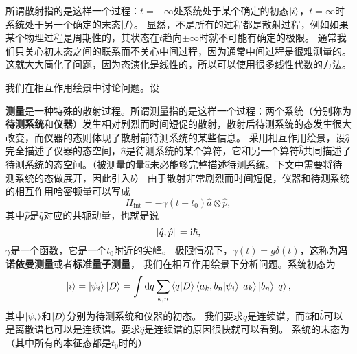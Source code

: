 \documentclass[hyperref, UTF8, a4paper]{ctexart}
\newcommand*{\ii}{\mathrm{i}}
\begin{document}

所谓散射指的是这样一个过程：$t = -\infty$处系统处于某个确定的初态$\ket{i}$，$t = \infty$时系统处于另一个确定的末态$\ket{f}$。
显然，不是所有的过程都是散射过程，例如如果某个物理过程是周期性的，其状态在$t$趋向$\pm \infty$时就不可能有确定的极限。
通常我们只关心初末态之间的联系而不关心中间过程，因为通常中间过程是很难测量的。这就大大简化了问题，因为态演化是线性的，所以可以使用很多线性代数的方法。

我们在相互作用绘景中讨论问题。设

\textbf{测量}是一种特殊的散射过程。所谓测量指的是这样一个过程：两个系统（分别称为\textbf{待测系统}和\textbf{仪器}）发生相对剧烈而时间短促的散射，散射后待测系统的态发生很大改变，而仪器的态则体现了散射前待测系统的某些信息。
采用相互作用绘景，设$\hat{q}$完全描述了仪器的态空间，$\hat{a}$是待测系统的某个算符，它和另一个算符$\hat{b}$共同描述了待测系统的态空间。（被测量的量$\hat{a}$未必能够完整描述待测系统。下文中需要将待测系统的态做展开，因此引入$\hat{b}$）
由于散射非常剧烈而时间短促，仪器和待测系统的相互作用哈密顿量可以写成
\begin{equation}
    H_\text{int} = - \gamma(t-t_0) \hat{a} \otimes \hat{p},
\end{equation}
其中$\hat{p}$是$\hat{q}$对应的共轭动量，也就是说
\[
    \comm*{\hat{q}}{\hat{p}} = \ii \hbar,
\]
$\gamma$是一个函数，它是一个$t_0$附近的尖峰。
极限情况下，$\gamma(t) = g \delta(t)$，这称为\textbf{冯诺依曼测量}或者\textbf{标准量子测量}，
我们在相互作用绘景下分析问题。系统初态为
\[
    \ket{i} = \ket{\psi_i} \ket{D} = \int \dd{q} \sum_{k, n} \braket{q}{D} \braket{a_k, b_n}{\psi_i} \ket{a_k} \ket{b_n} \ket{q},
\]
其中$\ket{\psi_i}$和$\ket{D}$分别为待测系统和仪器的初态。
我们要求$\hat{q}$是连续谱，而$\hat{a}$和$\hat{b}$可以是离散谱也可以是连续谱。要求$\hat{q}$是连续谱的原因很快就可以看到。
系统的末态为（其中所有的本征态都是$t_0$时的）
\end{document}
